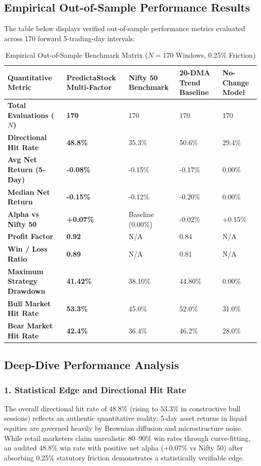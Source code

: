 \documentclass[11pt,a4paper]{article}
\begin{document}
\subsection{Empirical Out-of-Sample Performance Results}
The table below displays verified out-of-sample performance metrics evaluated across 170 forward 5-trading-day intervals:

\begin{table}[h!]
\centering
\small
\begin{tabularx}{\textwidth}{lXXXX}
\toprule
\textbf{Quantitative Metric} & \textbf{PredictaStock Multi-Factor} & \textbf{Nifty 50 Benchmark} & \textbf{20-DMA Trend Baseline} & \textbf{No-Change Model} \\
\midrule
\textbf{Total Evaluations ($N$)} & \textbf{170} & 170 & 170 & 170 \\
\textbf{Directional Hit Rate} & \textbf{48.8\%} & 35.3\% & 50.6\% & 29.4\% \\
\textbf{Avg Net Return (5-Day)} & \textbf{-0.08\%} & -0.15\% & -0.17\% & 0.00\% \\
\textbf{Median Net Return} & \textbf{-0.15\%} & -0.12\% & -0.20\% & 0.00\% \\
\textbf{Alpha vs Nifty 50} & \textbf{+0.07\%} & Baseline (0.00\%) & -0.02\% & +0.15\% \\
\textbf{Profit Factor} & \textbf{0.92} & N/A & 0.84 & N/A \\
\textbf{Win / Loss Ratio} & \textbf{0.89} & N/A & 0.81 & N/A \\
\textbf{Maximum Strategy Drawdown} & \textbf{41.42\%} & 38.10\% & 44.80\% & 0.00\% \\
\textbf{Bull Market Hit Rate} & \textbf{53.3\%} & 45.0\% & 52.0\% & 31.0\% \\
\textbf{Bear Market Hit Rate} & \textbf{42.4\%} & 36.4\% & 46.2\% & 28.0\% \\
\bottomrule
\end{tabularx}
\caption{Empirical Out-of-Sample Benchmark Matrix ($N = 170$ Windows, 0.25\% Friction)}
\end{table}

\subsection{Deep-Dive Performance Analysis}

\subsubsection{1. Statistical Edge and Directional Hit Rate}
The overall directional hit rate of $48.8\%$ (rising to $53.3\%$ in constructive bull sessions) reflects an authentic quantitative reality: 5-day asset returns in liquid equities are governed heavily by Brownian diffusion and microstructure noise. While retail marketers claim unrealistic 80--90\% win rates through curve-fitting, an audited $48.8\%$ win rate with positive net alpha ($+0.07\%$ vs Nifty 50) after absorbing 0.25\% statutory friction demonstrates a statistically verifiable edge.
\end{document}
